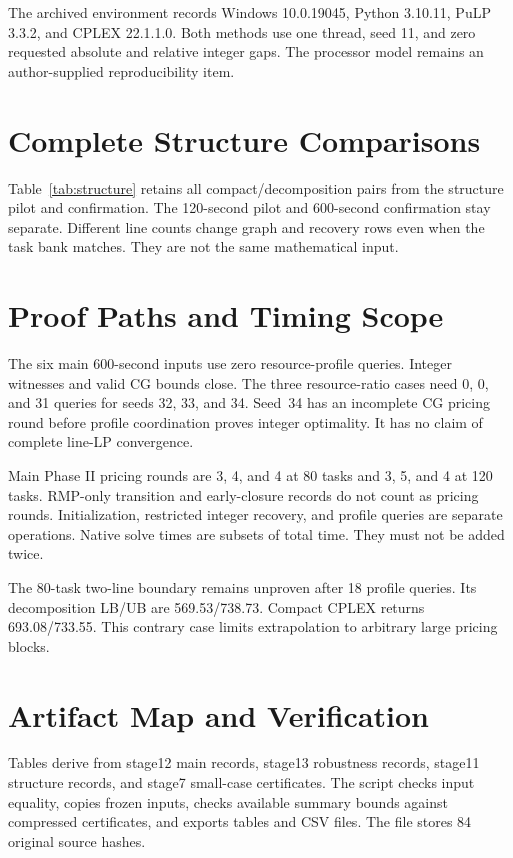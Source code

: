 \documentclass[letterpaper,journal]{IEEEtran}
\begin{document}
The archived environment records Windows 10.0.19045, Python 3.10.11, PuLP 3.3.2, and CPLEX 22.1.1.0. Both methods use one thread, seed 11, and zero requested absolute and relative integer gaps. The processor model remains an author-supplied reproducibility item.

\section{Complete Structure Comparisons}

Table~\ref{tab:structure} retains all compact/decomposition pairs from the structure pilot and confirmation. The 120-second pilot and 600-second confirmation stay separate. Different line counts change graph and recovery rows even when the task bank matches. They are not the same mathematical input.

\section{Proof Paths and Timing Scope}
The six main 600-second inputs use zero resource-profile queries. Integer witnesses and valid CG bounds close. The three resource-ratio cases need 0, 0, and 31 queries for seeds 32, 33, and 34. Seed~34 has an incomplete CG pricing round before profile coordination proves integer optimality. It has no claim of complete line-LP convergence.

Main Phase II pricing rounds are 3, 4, and 4 at 80 tasks and 3, 5, and 4 at 120 tasks. RMP-only transition and early-closure records do not count as pricing rounds. Initialization, restricted integer recovery, and profile queries are separate operations. Native solve times are subsets of total time. They must not be added twice.

The 80-task two-line boundary remains unproven after 18 profile queries. Its decomposition LB/UB are 569.53/738.73. Compact CPLEX returns 693.08/733.55. This contrary case limits extrapolation to arbitrary large pricing blocks.

\section{Artifact Map and Verification}
Tables derive from stage12 main records, stage13 robustness records, stage11 structure records, and stage7 small-case certificates. The script  checks input equality, copies frozen inputs, checks available summary bounds against compressed certificates, and exports tables and CSV files. The file  stores 84 original source hashes.
\end{document}
